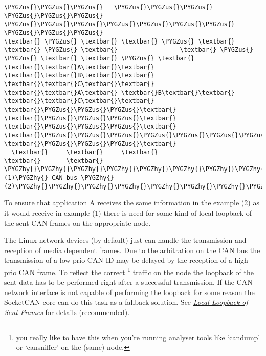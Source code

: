 \documentclass[a4paper,8pt,english]{sphinxmanual}
\def\PYGZus{\char`\_}
\def\PYGZhy{\char`\-}
\begin{document}
\begin{Verbatim}[commandchars=\\\{\}]
 \PYGZus{}\PYGZus{}\PYGZus{}   \PYGZus{}\PYGZus{}\PYGZus{}   \PYGZus{}\PYGZus{}\PYGZus{}                   \PYGZus{}\PYGZus{}\PYGZus{}\PYGZus{}\PYGZus{}\PYGZus{}\PYGZus{}   \PYGZus{}\PYGZus{}\PYGZus{}
\textbar{} \PYGZus{} \textbar{} \textbar{} \PYGZus{} \textbar{} \textbar{} \PYGZus{} \textbar{}                 \textbar{} \PYGZus{}   \PYGZus{} \textbar{} \textbar{} \PYGZus{} \textbar{}
\textbar{}\textbar{}A\textbar{}\textbar{} \textbar{}\textbar{}B\textbar{}\textbar{} \textbar{}\textbar{}C\textbar{}\textbar{}                 \textbar{}\textbar{}A\textbar{} \textbar{}B\textbar{}\textbar{} \textbar{}\textbar{}C\textbar{}\textbar{}
\textbar{}\PYGZus{}\PYGZus{}\PYGZus{}\textbar{} \textbar{}\PYGZus{}\PYGZus{}\PYGZus{}\textbar{} \textbar{}\PYGZus{}\PYGZus{}\PYGZus{}\textbar{}                 \textbar{}\PYGZus{}\PYGZus{}\PYGZus{}\PYGZus{}\PYGZus{}\PYGZus{}\PYGZus{}\textbar{} \textbar{}\PYGZus{}\PYGZus{}\PYGZus{}\textbar{}
  \textbar{}     \textbar{}     \textbar{}                       \textbar{}       \textbar{}
\PYGZhy{}\PYGZhy{}\PYGZhy{}\PYGZhy{}\PYGZhy{}\PYGZhy{}\PYGZhy{}\PYGZhy{}\PYGZhy{}\PYGZhy{}\PYGZhy{}\PYGZhy{}\PYGZhy{}\PYGZhy{}\PYGZhy{}\PYGZhy{}\PYGZhy{}(1)\PYGZhy{} CAN bus \PYGZhy{}(2)\PYGZhy{}\PYGZhy{}\PYGZhy{}\PYGZhy{}\PYGZhy{}\PYGZhy{}\PYGZhy{}\PYGZhy{}\PYGZhy{}\PYGZhy{}\PYGZhy{}\PYGZhy{}\PYGZhy{}\PYGZhy{}\PYGZhy{}
\end{Verbatim}

To ensure that application A receives the same information in the
example (2) as it would receive in example (1) there is need for
some kind of local loopback of the sent CAN frames on the appropriate
node.

The Linux network devices (by default) just can handle the
transmission and reception of media dependent frames. Due to the
arbitration on the CAN bus the transmission of a low prio CAN-ID
may be delayed by the reception of a high prio CAN frame. To
reflect the correct \footnote[*]{
you really like to have this when you're running analyser
tools like `candump' or `cansniffer' on the (same) node.
} traffic on the node the loopback of the sent
data has to be performed right after a successful transmission. If
the CAN network interface is not capable of performing the loopback for
some reason the SocketCAN core can do this task as a fallback solution.
See {\hyperref[networking/can:socketcan\string-local\string-loopback1]{\emph{Local Loopback of Sent Frames}}} for details (recommended).
\end{document}
